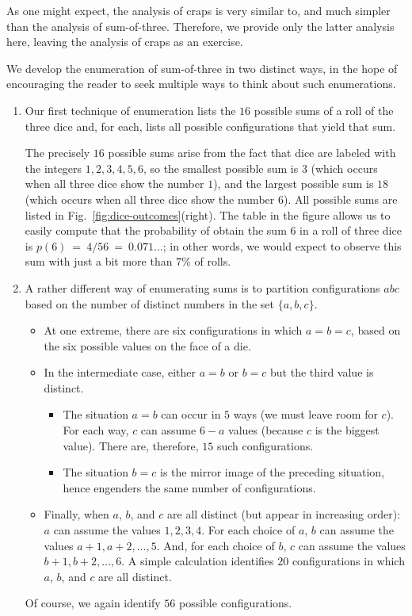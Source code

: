 \bigskip

As one might expect, the analysis of craps is very similar to, and
much simpler than the analysis of sum-of-three.  Therefore, we provide
only the latter analysis here, leaving the analysis of craps as an
exercise.

We develop the enumeration of sum-of-three in two distinct ways, in
the hope of encouraging the reader to seek multiple ways to think
about such enumerations.
\begin{enumerate}
\item 
Our first technique of enumeration lists the $16$ possible sums of a
roll of the three dice and, for each, lists all possible
configurations that yield that sum.

The precisely $16$ possible sums arise from the fact that dice are
labeled with the integers $1, 2, 3, 4, 5, 6$, so the smallest possible
sum is $3$ (which occurs when all three dice show the number $1$), and
the largest possible sum is $18$ (which occurs when all three dice
show the number $6$).  All possible sums are listed in
Fig.~\ref{fig:dice-outcomes}(right).  The table in the figure allows
us to easily compute that the probability of obtain the sum $6$ in a
roll of three dice is $p(6) \ = \ 4/56 \ = \ 0.071\ldots$; in other
words, we would expect to observe this sum with just a bit more than
$7\%$ of rolls.

\item 
A rather different way of enumerating sums is to partition
configurations $abc$ based on the number of distinct numbers in the
set $\{ a, b, c\}$.
\begin{itemize}
\item
At one extreme, there are six configurations in which $a = b = c$,
based on the six possible values on the face of a die.
\item
In the intermediate case, either $a=b$ or $b=c$ but the third value is
distinct.
  \begin{itemize}
  \item
The situation $a=b$ can occur in $5$ ways (we must leave room for
$c$).  For each way, $c$ can assume $6-a$ values (because $c$ is the
biggest value).  There are, therefore, $15$ such configurations.
  \item
The situation $b=c$ is the mirror image of the preceding situation,
hence engenders the same number of configurations.
  \end{itemize}

\item
Finally, when $a$, $b$, and $c$ are all distinct (but appear in
increasing order): $a$ can assume the values $1, 2, 3, 4$.  For each
choice of $a$, $b$ can assume the values $a+1, a+2, \ldots, 5$.  And,
for each choice of $b$, $c$ can assume the values $b+1, b+2, \ldots,
6$.  A simple calculation identifies $20$ configurations in which $a$,
$b$, and $c$ are all distinct.
\end{itemize}
Of course, we again identify $56$ possible configurations.
\end{enumerate}

